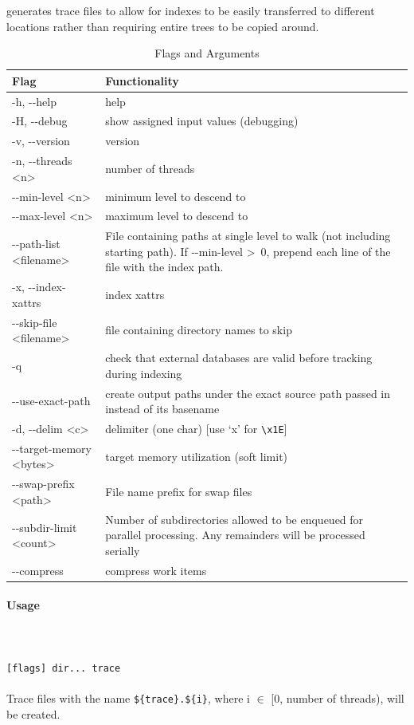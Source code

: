 \subsubsection{\gufidirtrace}
\gufidirtrace generates trace files to allow for indexes to be easily
transferred to different locations rather than requiring entire trees
to be copied around.

\begin{table} [htb]
  \centering
  \begin{tabularx}{\textwidth}{|l|X|}
    \hline
    Flag & Functionality \\
    \hline
    -h, -{}-help & help \\
    \hline
    -H, -{}-debug & show assigned input values (debugging) \\
    \hline
    -v, -{}-version & version \\
    \hline
    -n, -{}-threads \textless n\textgreater & number of threads \\
    \hline
    -{}-min-level \textless n\textgreater & minimum level to descend to \\
    \hline
    -{}-max-level \textless n\textgreater & maximum level to descend to \\
    \hline
    -{}-path-list \textless filename\textgreater & File containing paths at
    single level to walk (not including starting path). If -{}-min-level
    \textgreater \ 0, prepend each line of the file with the index path. \\
    \hline
    -x, -{}-index-xattrs & index xattrs \\
    \hline
    -{}-skip-file \textless filename\textgreater & file containing directory names to skip \\
    \hline
    -q & check that external databases are valid before tracking during indexing \\
    \hline
    -{}-use-exact-path & create output paths under the exact source path passed in instead of its basename \\
    \hline
    -d, -{}-delim \textless c\textgreater & delimiter (one char)  [use `x' for \texttt{\textbackslash x1E}] \\
    \hline
    -{}-target-memory \textless bytes\textgreater & target memory utilization (soft limit) \\
    \hline
    -{}-swap-prefix \textless path\textgreater & File name prefix for swap files \\
    \hline
    -{}-subdir-limit \textless count\textgreater & Number of subdirectories allowed to be enqueued for parallel processing. Any remainders will be processed serially \\
    \hline
    -{}-compress & compress work items \\
    \hline
  \end{tabularx}
  \caption{\gufidirtrace Flags and Arguments}
\end{table}

\paragraph{Usage} ~\\\\
\gufidirtrace \texttt{[flags] dir... trace} \\\\
Trace files with the name \texttt{\$\{trace\}.\$\{i\}}, where i $\in$ [0, number of threads), will be created.
